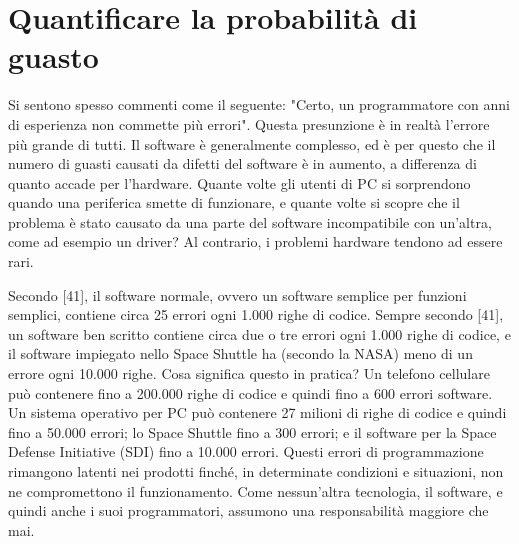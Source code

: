 \section{Quantificare la probabilità di guasto}
\label{sec:06-3}
Si sentono spesso commenti come il seguente: "Certo, un programmatore con anni di esperienza non commette più errori". Questa presunzione è in realtà l'errore più grande di tutti. Il software è generalmente complesso, ed è per questo che il numero di guasti causati da difetti del software è in aumento, a differenza di quanto accade per l'hardware. Quante volte gli utenti di PC si sorprendono quando una periferica smette di funzionare, e quante volte si scopre che il problema è stato causato da una parte del software incompatibile con un'altra, come ad esempio un driver? Al contrario, i problemi hardware tendono ad essere rari.

Secondo [41], il software normale, ovvero un software semplice per funzioni semplici, contiene circa 25 errori ogni 1.000 righe di codice. Sempre secondo [41], un software ben scritto contiene circa due o tre errori ogni 1.000 righe di codice, e il software impiegato nello Space Shuttle ha (secondo la NASA) meno di un errore ogni 10.000 righe. Cosa significa questo in pratica? Un telefono cellulare può contenere fino a 200.000 righe di codice e quindi fino a 600 errori software. Un sistema operativo per PC può contenere 27 milioni di righe di codice e quindi fino a 50.000 errori; lo Space Shuttle fino a 300 errori; e il software per la Space Defense Initiative (SDI) fino a 10.000 errori.
Questi errori di programmazione rimangono latenti nei prodotti finché, in determinate condizioni e situazioni, non ne compromettono il funzionamento. Come nessun'altra tecnologia, il software, e quindi anche i suoi programmatori, assumono una responsabilità maggiore che mai.

